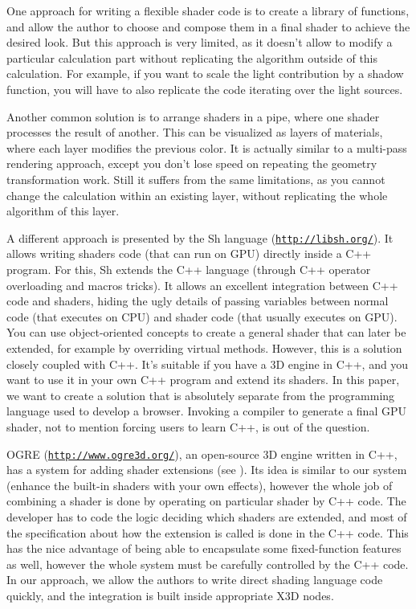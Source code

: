 \documentclass{acmsiggraph}                     %
\newcommand*{\myhref}[2]{\texttt{\href{#1}{\nolinkurl{#2}}}}
\begin{document}
One approach for writing a flexible shader code is to create
a library of functions, and allow the author to choose and compose them
in a final shader to achieve the desired look. But this approach is very limited,
as it doesn't allow to modify a particular calculation part without
replicating the algorithm outside of this calculation.
For example, if you want to scale the light contribution by a shadow function,
you will have to also replicate the code iterating over the light sources.

Another common solution is to arrange shaders in a pipe, where one
shader processes the result of another. This can be visualized as
layers of materials, where each layer modifies the previous
color. It is actually similar to a multi-pass rendering approach,
except you don't lose speed on repeating the geometry transformation work.
Still it suffers from the same limitations, as you cannot change
the calculation within an existing layer, without replicating the whole
algorithm of this layer.


A different approach is presented by the Sh language (\myhref{http://libsh.org/}{http://libsh.org/}).
It allows writing shaders code (that can run on GPU) directly inside a
C++ program. For this, Sh extends the C++ language (through C++
operator overloading and macros tricks). It allows an excellent
integration between C++ code and shaders, hiding the ugly details of
passing variables between normal code (that executes on CPU) and
shader code (that usually executes on GPU). You can use
object-oriented concepts to create a general shader that can
later be extended, for example by overriding virtual
methods. However, this is a solution closely coupled with C++. It's
suitable if you have a 3D engine in C++, and you want to use it in your
own C++ program and extend its shaders. In this paper, we want to
create a solution that is absolutely separate from the programming
language used to develop a browser. Invoking a compiler to generate a
final GPU shader, not to mention forcing users to learn C++, is out of the
question.

OGRE (\myhref{http://www.ogre3d.org/}{http://www.ogre3d.org/}), an open-source 3D engine written in C++, has a system
for adding shader extensions (see \cite{ogre:shader}). Its idea is similar
to our system (enhance the built-in shaders with your own effects),
however the whole job of combining a shader is done by operating
on particular shader by C++ code. The developer has to code
the logic deciding which shaders are extended, and most of the specification
about how the extension is called is done in the C++ code.
This has the nice advantage of being able to encapsulate some fixed-function
features as well, however the whole system must be carefully controlled by
the C++ code. In our approach, we allow the authors to write direct shading
language code quickly, and the integration is built inside appropriate X3D nodes.
\end{document}
